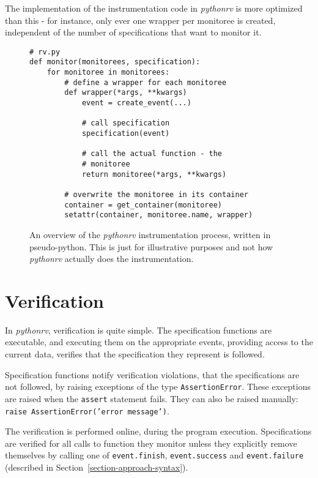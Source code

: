 \documentclass[a4paper,11pt]{kth-mag}
\begin{document}
The implementation of the instrumentation code in \textit{pythonrv} is more
optimized than this - for instance, only ever one wrapper per monitoree is
created, independent of the number of specifications that want to monitor it.

\begin{figure}[h!]
	\begin{center}
	\begin{minipage}{0.7\textwidth}
	\begin{lstlisting}
# rv.py
def monitor(monitorees, specification):
	for monitoree in monitorees:
		# define a wrapper for each monitoree
		def wrapper(*args, **kwargs)
			event = create_event(...)

			# call specification
			specification(event)

			# call the actual function - the
			# monitoree
			return monitoree(*args, **kwargs)

		# overwrite the monitoree in its container
		container = get_container(monitoree)
		setattr(container, monitoree.name, wrapper)
	\end{lstlisting}
	\end{minipage}
	\end{center}

	\caption{An overview of the \textit{pythonrv} instrumentation process,
		written in pseudo-python. This is just for illustrative purposes and not
		how \textit{pythonrv} actually does the instrumentation.}
	\label{figure-instrumentation-overview}
\end{figure}



\section{Verification} \label{section-approach-verification}

In \textit{pythonrv}, verification is quite simple. The specification functions
are executable, and executing them on the appropriate events, providing access
to the current data, verifies that the specification they represent is
followed.

Specification functions notify verification violations, that the specifications
are not followed, by raising exceptions of the type \texttt{AssertionError}.
These exceptions are raised when the \texttt{assert} statement fails. They can
also be raised manually: \texttt{raise AssertionError('error message')}.

The verification is performed online, during the program execution.
Specifications are verified for all calls to function they monitor unless they
explicitly remove themselves by calling one of \texttt{event.finish},
\texttt{event.success} and \texttt{event.failure} (described in
Section~\ref{section-approach-syntax}).
\end{document}
